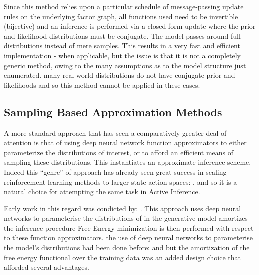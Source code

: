 \documentclass[onecolumn]{IEEEtran}
\begin{document}
Since this method relies upon a particular schedule of message-passing update rules on the underlying factor graph, all functions used need to be invertible (bijective) and an inference is performed via a closed form update where the prior and likelihood distributions must be conjugate. The model passes around full distributions instead of mere samples. This results in a very fast and efficient implementation - when applicable, but the issue is that it is not a completely generic method, owing to the many assumptions as to the model structure just enumerated. many real-world distributions do not have conjugate prior and likelihoods and so this method cannot be applied in these cases. 


\subsection{Sampling Based Approximation Methods}

A more standard approach that has seen a comparatively greater deal of attention is that of using deep neural network function approximators to either parameterize the distributions of interest, or to afford an efficient means of sampling these distributions. This instantiates an approximate inference scheme. Indeed this ``genre'' of approach has already seen great success in scaling reinforcement learning methods to larger state-action spaces: \textcite{Async-Methods-Deep-RL}, \textcite{ATARI-Deep-RL} and so it is a natural choice for attempting the same task in Active Inference.

Early work in this regard was condicted by: \textcite{Scaling-AIF}. This approach uses deep neural networks to parameterise the distributions of in the generative model amortizes the inference procedure Free Energy minimization is then performed with respect to these function approximators. the use of deep neural networks to parameterise the model's distributions had been done before: \textcite{Deep-AIF} and \textcite{Deep-AIF-As-Var-Policy-Grad} but the amortization of the free energy functional over the training data was an added design choice that afforded several advantages. 
\end{document}
